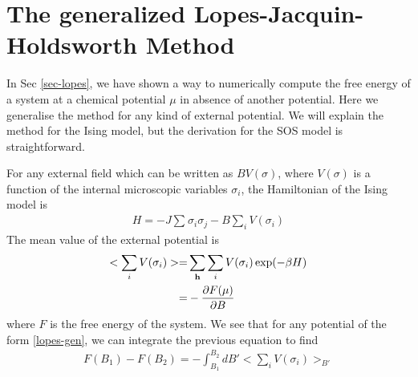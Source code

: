 \section{The generalized Lopes-Jacquin-Holdsworth Method}
\label{gen-lopes}

In Sec \ref{sec-lopes}, we have shown a way to numerically compute the free energy of a system at a chemical potential $\mu$ in absence of another potential. Here we generalise the method for any kind of external potential. We will explain the method for the Ising model, but the derivation for the SOS model is straightforward.

For any external field which can be written as $B V(\sigma)$, where $V(\sigma)$ is a function of the internal microscopic variables $\sigma_i$,  the Hamiltonian of the Ising model is
\begin{align}
H = - J \sum_{} \sigma_i \sigma_j - B \sum_i V(\sigma_i)
\end{align}
The mean value of the external potential is
\begin{align}
    <  \sum_i V(\sigma_i) > =&  \sum_{\bf h} \sum_i V(\sigma_i) \exp(-\beta H) \nonumber \\
    =&  - \frac{\partial F(\mu)}{\partial B}
\end{align}
where $F$ is the free energy of the system. We see that for any potential of the form \eqref{lopes-gen}, we can integrate the previous equation to find
\begin{align}
   F(B_1) - F(B_2) = - \int_{B_1}^{B_2} d B'  < \sum_i V(\sigma_i) >_{B'} 
   \label{lopes-gen}
\end{align}

